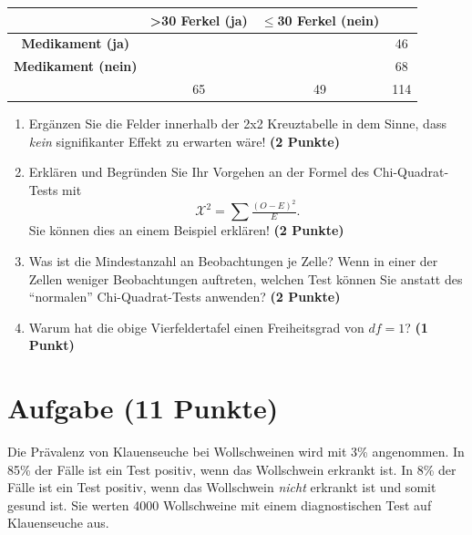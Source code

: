 \documentclass[a4paper, 10pt]{scrartcl}\usepackage[]{graphicx}\usepackage[]{xcolor}
\begin{document}
\vspace{5Ex}

\begin{center}
  \Large
  \begin{tabular}{c|c|c|c}
     & \textbf{>30 Ferkel (ja)} & \textbf{$\leq$30 Ferkel (nein)} &  \strut\\
    \hline
    \textbf{Medikament (ja)} & \phantom{100}  & \phantom{100}  &   46  \strut\\
    \hline
    \textbf{Medikament (nein)} & \phantom{100}  & \phantom{100}  &   68   \strut\\
    \hline
     &  65 &  49 &  114  \strut\\
  \end{tabular}
\end{center}



\vspace{5Ex}

\begin{enumerate}
\item Erg{\"a}nzen Sie die Felder innerhalb der 2x2 Kreuztabelle in dem Sinne,
  dass \textit{kein} signifikanter Effekt zu erwarten w{\"a}re!
  \textbf{(2 Punkte)}
\item Erkl{\"a}ren und Begr{\"u}nden Sie Ihr Vorgehen an der Formel des
  Chi-Quadrat-Tests mit
  \begin{equation*}
  \mathcal{X}^2 = \sum\tfrac{(O - E)^2}{E}.  
  \end{equation*}
  Sie k{\"o}nnen dies an einem Beispiel erkl{\"a}ren! \textbf{(2 Punkte)}
\item Was ist die Mindestanzahl an Beobachtungen je Zelle? Wenn in einer
  der Zellen weniger Beobachtungen auftreten, welchen Test k{\"o}nnen Sie
  anstatt des "`normalen"' Chi-Quadrat-Tests anwenden? \textbf{(2 Punkte)}
\item Warum hat die obige Vierfeldertafel einen Freiheitsgrad von $df=1$?
  \textbf{(1 Punkt)}
\end{enumerate} 
\clearpage

\section{Aufgabe \hfill (11 Punkte)}

Die Pr{\"a}valenz von Klauenseuche bei Wollschweinen wird mit
3\% angenommen. In 85\% der F{\"a}lle ist ein Test positiv, wenn das Wollschwein erkrankt
ist. In 8\% der F{\"a}lle ist ein Test positiv,
wenn das Wollschwein \textit{nicht} erkrankt ist und somit gesund ist. Sie
werten 4000 Wollschweine mit einem
diagnostischen Test auf Klauenseuche aus.
\end{document}
